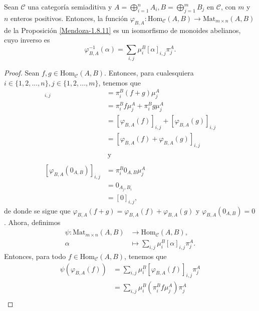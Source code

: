 \documentclass[tesis]{subfiles}
\begin{document}
\begin{Prop}\label{Mendoza-1.9.4}
    Sean $\mathscr{C}$ una categoría semiaditiva y $A=\bigoplus_{i=1}^n A_i, B=\bigoplus_{j=1}^m B_j$ en $\mathscr{C}$, con $m$ y $n$ enteros positivos. Entonces, la función $\varphi_{B,A}:\text{Hom}_\mathscr{C}(A,B)\to \text{Mat}_{m\times n}(A,B)$ de la Proposición \ref{Mendoza-1.8.11} es un isomorfismo de monoides abelianos, cuyo inverso es
    \[
        \varphi^{-1}_{B,A}(\alpha) = \sum_{i,j} \mu_i^B [\alpha]_{i,j} \pi_j^A.
    \] 
\end{Prop}

\begin{proof}

    Sean $f,g\in\text{Hom}_\mathscr{C}(A,B)$. Entonces, para cualesquiera $i\in\{1,2,...,n\}, j\in\{1,2,...,m\}$, tenemos que
    \begin{align*}
        [\varphi_{B,A}(f+g)]_{i,j} &= \pi_i^B(f+g)\mu_j^A \\
                                   &= \pi_i^Bf\mu_j^A + \pi_i^Bg\mu_j^A \\
                                   &= [\varphi_{B,A}(f)]_{i,j} + [\varphi_{B,A}(g)]_{i,j} \\
                                   &= [\varphi_{B,A}(f) + \varphi_{B,A}(g)]_{i,j} \\ \\
                                   & \ \text{y} \\ \\
        [\varphi_{B,A}(0_{A,B})]_{i,j} &= \pi_i^B 0_{A,B} \mu_j^A \\
                                       &= 0_{A_j,B_i} \\
                                       &= [0]_{i,j},
    \end{align*}
    de donde se sigue que $\varphi_{B,A}(f+g) = \varphi_{B,A}(f) + \varphi_{B,A}(g)$ y $\varphi_{B,A}(0_{A,B})=0$. Ahora, definimos
    \begin{align*}
        \psi: \text{Mat}_{m\times n}(A,B)&\to \text{Hom}_\mathscr{C}(A,B), \\
                                  \alpha &\mapsto \sum_{i,j} \mu_i^B[\alpha]_{i,j}\pi_j^A.
    \end{align*}
    Entonces, para todo $f\in\text{Hom}_\mathscr{C}(A,B)$, tenemos que
    \begin{align*}
        \psi(\varphi_{B,A}(f)) &= \sum_{i,j} \mu_i^B [\varphi_{B,A}(f)]_{i,j} \pi_j^A \\
                               &= \sum_{i,j} \mu_i^B(\pi_i^B f \mu_j^A)\pi_j^A \\

\end{align*}
\end{proof}
\end{document}
